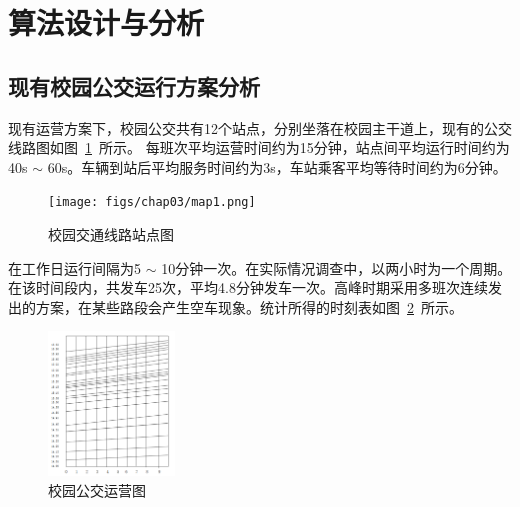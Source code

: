 \section{算法设计与分析}


\subsection{现有校园公交运行方案分析}
现有运营方案下，校园公交共有12个站点，分别坐落在校园主干道上，现有的公交线路图如图~\ref{fig1}~所示。
每班次平均运营时间约为15分钟，站点间平均运行时间约为40s $\sim$ 60s。车辆到站后平均服务时间约为3s，车站乘客平均等待时间约为6分钟。
\begin{figure}[htbp]
\centering
\texttt{[image: figs/chap03/map1.png]}
\caption{校园交通线路站点图}
\label{fig1}
\end{figure}

在工作日运行间隔为5 $\sim$ 10分钟一次。在实际情况调查中，以两小时为一个周期。
在该时间段内，共发车25次，平均4.8分钟发车一次。高峰时期采用多班次连续发出的方案，在某些路段会产生空车现象。统计所得的时刻表如图~\ref{fig2}~所示。
\begin{figure}[htbp]
    \centering
    \includegraphics[width=0.3\textwidth]{figs/chap03/times1.png}
    \caption{校园公交运营图}
    \label{fig2}
    \end{figure}

